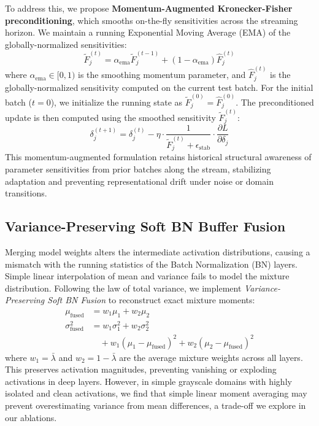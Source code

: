 \documentclass{article}
\theoremstyle{plain}
\theoremstyle{definition}
\theoremstyle{remark}
\begin{document}
To address this, we propose \textbf{Momentum-Augmented Kronecker-Fisher preconditioning}, which smooths on-the-fly sensitivities across the streaming horizon. We maintain a running Exponential Moving Average (EMA) of the globally-normalized sensitivities:
\begin{equation}
    \tilde{F}_j^{(t)} = \alpha_{\text{ema}} \tilde{F}_j^{(t-1)} + (1 - \alpha_{\text{ema}}) \hat{F}_j^{(t)}
\end{equation}
where $\alpha_{\text{ema}} \in [0, 1)$ is the smoothing momentum parameter, and $\hat{F}_j^{(t)}$ is the globally-normalized sensitivity computed on the current test batch. For the initial batch ($t=0$), we initialize the running state as $\tilde{F}_j^{(0)} = \hat{F}_j^{(0)}$. The preconditioned update is then computed using the smoothed sensitivity $\tilde{F}_j^{(t)}$:
\begin{equation}
    \delta_j^{(t+1)} = \delta_j^{(t)} - \eta \cdot \frac{1}{\tilde{F}_j^{(t)} + \epsilon_{\text{stab}}} \cdot \frac{\partial L}{\partial \delta_j}
\end{equation}
This momentum-augmented formulation retains historical structural awareness of parameter sensitivities from prior batches along the stream, stabilizing adaptation and preventing representational drift under noise or domain transitions.

\subsection{Variance-Preserving Soft BN Buffer Fusion}
Merging model weights alters the intermediate activation distributions, causing a mismatch with the running statistics of the Batch Normalization (BN) layers. Simple linear interpolation of mean and variance fails to model the mixture distribution. Following the law of total variance, we implement \textit{Variance-Preserving Soft BN Fusion} to reconstruct exact mixture moments:
\begin{align}
    \mu_{\text{fused}} &= w_1 \mu_1 + w_2 \mu_2 \\
    \sigma_{\text{fused}}^2 &= w_1 \sigma_1^2 + w_2 \sigma_2^2 \nonumber \\
    &\quad + w_1(\mu_1 - \mu_{\text{fused}})^2 + w_2(\mu_2 - \mu_{\text{fused}})^2
\end{align}
where $w_1 = \bar{\lambda}$ and $w_2 = 1 - \bar{\lambda}$ are the average mixture weights across all layers. This preserves activation magnitudes, preventing vanishing or exploding activations in deep layers. However, in simple grayscale domains with highly isolated and clean activations, we find that simple linear moment averaging may prevent overestimating variance from mean differences, a trade-off we explore in our ablations.
\end{document}

